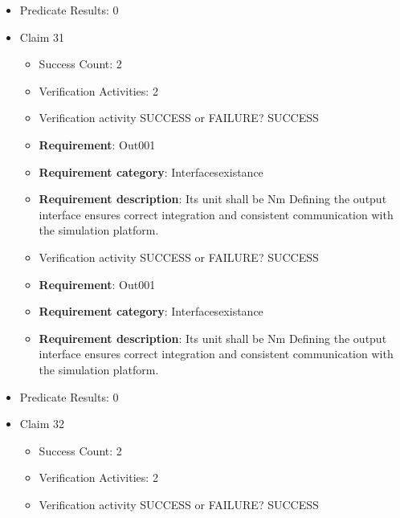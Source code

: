 \documentclass{article}
\begin{document}
\begin{itemize}
\begin{itemize}
					\item Verification activity SUCCESS or FAILURE? SUCCESS
		
						\item \textbf{Requirement}: In030 
						\item \textbf{Requirement category}: Interfacesexistance 
						\item \textbf{Requirement description}: Its initial value shall be set to 1 Defining the interface name, type, and initial value ensures correct integration and consistent communication with the simulation platform.
					
				\end{itemize}
				
									    
				\item Predicate Results: 0

  				  \item Claim 31
				\begin{itemize}
			    	\item Success Count: 2 
			    	\item Verification Activities: 2
					\item Verification activity SUCCESS or FAILURE? SUCCESS
		
						\item \textbf{Requirement}: Out001 
						\item \textbf{Requirement category}: Interfacesexistance 
						\item \textbf{Requirement description}: Its unit shall be Nm Defining the output interface ensures correct integration and consistent communication with the simulation platform.
					
					\item Verification activity SUCCESS or FAILURE? SUCCESS
		
						\item \textbf{Requirement}: Out001 
						\item \textbf{Requirement category}: Interfacesexistance 
						\item \textbf{Requirement description}: Its unit shall be Nm Defining the output interface ensures correct integration and consistent communication with the simulation platform.
					
				\end{itemize}
				
									    
				\item Predicate Results: 0

  				  \item Claim 32
				\begin{itemize}
			    	\item Success Count: 2 
			    	\item Verification Activities: 2
					\item Verification activity SUCCESS or FAILURE? SUCCESS
		

\end{itemize}
\end{itemize}
\end{document}
